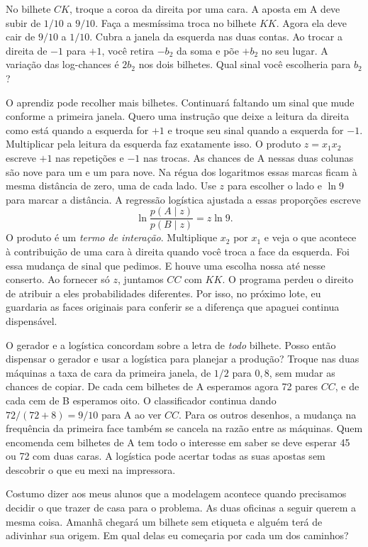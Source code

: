 No bilhete $CK$, troque a coroa da direita por uma cara. A aposta em A deve subir de $1/10$ a $9/10$. Faça a mesmíssima troca no bilhete $KK$. Agora ela deve cair de $9/10$ a $1/10$. Cubra a janela da esquerda nas duas contas. Ao trocar a direita de $-1$ para $+1$, você retira $-b_2$ da soma e põe $+b_2$ no seu lugar. A variação das log-chances é $2b_2$ nos dois bilhetes. Qual sinal você escolheria para $b_2$?

O aprendiz pode recolher mais bilhetes. Continuará faltando um sinal que mude conforme a primeira janela. Quero uma instrução que deixe a leitura da direita como está quando a esquerda for $+1$ e troque seu sinal quando a esquerda for $-1$. Multiplicar pela leitura da esquerda faz exatamente isso. O produto $z=x_1x_2$ escreve $+1$ nas repetições e $-1$ nas trocas. As chances de A nessas duas colunas são nove para um e um para nove. Na régua dos logaritmos essas marcas ficam à mesma distância de zero, uma de cada lado. Use $z$ para escolher o lado e $\ln 9$ para marcar a distância. A regressão logística ajustada a essas proporções escreve
\[
              \ln\frac{p(A\mid z)}{p(B\mid z)}=z\ln 9 .
\]
O produto é um \emph{termo de interação}. Multiplique $x_2$ por $x_1$ e veja o que acontece à contribuição de uma cara à direita quando você troca a face da esquerda. Foi essa mudança de sinal que pedimos. E houve uma escolha nossa até nesse conserto. Ao fornecer só $z$, juntamos $CC$ com $KK$. O programa perdeu o direito de atribuir a eles probabilidades diferentes. Por isso, no próximo lote, eu guardaria as faces originais para conferir se a diferença que apaguei continua dispensável.

O gerador e a logística concordam sobre a letra de \emph{todo} bilhete. Posso então dispensar o gerador e usar a logística para planejar a produção? Troque nas duas máquinas a taxa de cara da primeira janela, de $1/2$ para $0{,}8$, sem mudar as chances de copiar. De cada cem bilhetes de A esperamos agora 72 pares $CC$, e de cada cem de B esperamos oito. O classificador continua dando $72/(72+8)=9/10$ para A ao ver $CC$. Para os outros desenhos, a mudança na frequência da primeira face também se cancela na razão entre as máquinas. Quem encomenda cem bilhetes de A tem todo o interesse em saber se deve esperar 45 ou 72 com duas caras. A logística pode acertar todas as suas apostas sem descobrir o que eu mexi na impressora.

Costumo dizer aos meus alunos que a modelagem acontece quando precisamos decidir o que trazer de casa para o problema. As duas oficinas a seguir querem a mesma coisa. Amanhã chegará um bilhete sem etiqueta e alguém terá de adivinhar sua origem. Em qual delas eu começaria por cada um dos caminhos?


